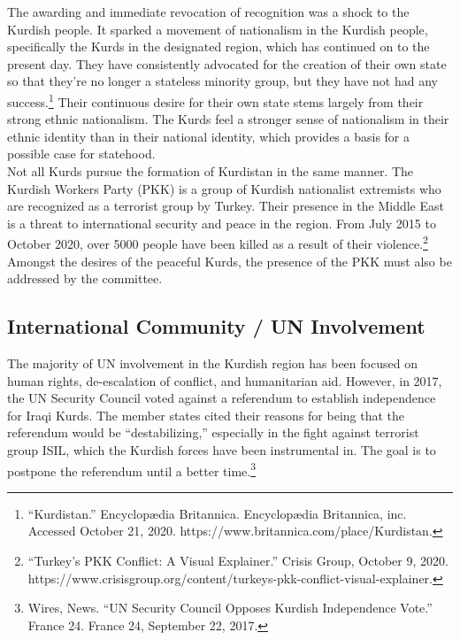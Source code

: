 \documentclass[10pt, letterpaper]{article}
\begin{document}
The awarding and immediate revocation of recognition was a shock to the
Kurdish people. It sparked a movement of nationalism in the Kurdish
people, specifically the Kurds in the designated region, which has
continued on to the present day. They have consistently advocated for
the creation of their own state so that they're no longer a stateless
minority group, but they have not had any success.\footnote{``Kurdistan.''
  Encyclopædia Britannica. Encyclopædia Britannica, inc. Accessed
  October 21, 2020. https://www.britannica.com/place/Kurdistan.} Their
continuous desire for their own state stems largely from their strong
ethnic nationalism. The Kurds feel a stronger sense of nationalism in
their ethnic identity than in their national identity, which provides a
basis for a possible case for statehood. \\

Not all Kurds pursue the formation of Kurdistan in the same manner. The
Kurdish Workers Party (PKK) is a group of Kurdish nationalist extremists
who are recognized as a terrorist group by Turkey. Their presence in the
Middle East is a threat to international security and peace in the
region. From July 2015 to October 2020, over 5000 people have been
killed as a result of their violence.\footnote{``Turkey's PKK Conflict:
  A Visual Explainer.'' Crisis Group, October 9, 2020.
  https://www.crisisgroup.org/content/turkeys-pkk-conflict-visual-explainer.}
Amongst the desires of the peaceful Kurds, the presence of the PKK must
also be addressed by the committee. \\

\subsection{International Community / UN Involvement}

The majority of UN involvement in the Kurdish region has been focused on
human rights, de-escalation of conflict, and humanitarian aid. However,
in 2017, the UN Security Council voted against a referendum to establish
independence for Iraqi Kurds. The member states cited their reasons for
being that the referendum would be ``destabilizing,'' especially in the
fight against terrorist group ISIL, which the Kurdish forces have been
instrumental in. The goal is to postpone the referendum until a better
time.\footnote{Wires, News. ``UN Security Council Opposes Kurdish
  Independence Vote.'' France 24. France 24, September 22, 2017.} \\
\end{document}
